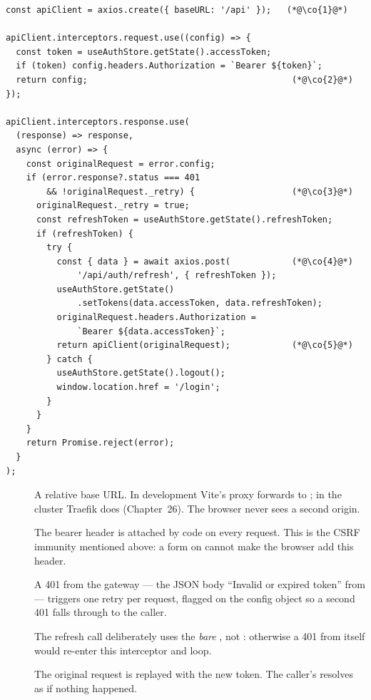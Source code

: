 \begin{lstlisting}
const apiClient = axios.create({ baseURL: '/api' });   (*@\co{1}@*)

apiClient.interceptors.request.use((config) => {
  const token = useAuthStore.getState().accessToken;
  if (token) config.headers.Authorization = `Bearer ${token}`;
  return config;                                        (*@\co{2}@*)
});

apiClient.interceptors.response.use(
  (response) => response,
  async (error) => {
    const originalRequest = error.config;
    if (error.response?.status === 401
        && !originalRequest._retry) {                   (*@\co{3}@*)
      originalRequest._retry = true;
      const refreshToken = useAuthStore.getState().refreshToken;
      if (refreshToken) {
        try {
          const { data } = await axios.post(            (*@\co{4}@*)
              '/api/auth/refresh', { refreshToken });
          useAuthStore.getState()
              .setTokens(data.accessToken, data.refreshToken);
          originalRequest.headers.Authorization =
              `Bearer ${data.accessToken}`;
          return apiClient(originalRequest);            (*@\co{5}@*)
        } catch {
          useAuthStore.getState().logout();
          window.location.href = '/login';
        }
      }
    }
    return Promise.reject(error);
  }
);
\end{lstlisting}

\begin{description}
  \item[] A relative base URL. In development Vite's proxy
  forwards  to ; in the cluster Traefik
  does (Chapter~26). The browser never sees a second origin.
  \item[] The bearer header is attached by code on every request.
  This is the CSRF immunity mentioned above: a form on
   cannot make the browser add this header.
  \item[] A 401 from the gateway --- the JSON body ``Invalid or
  expired token'' from  --- triggers one
  retry per request, flagged on the config object so a second 401
  falls through to the caller.
  \item[] The refresh call deliberately uses the \emph{bare}
  , not : otherwise a 401 from
   itself would re-enter this interceptor and loop.
  \item[] The original request is replayed with the new token.
  The caller's  resolves as if nothing happened.
\end{description}

